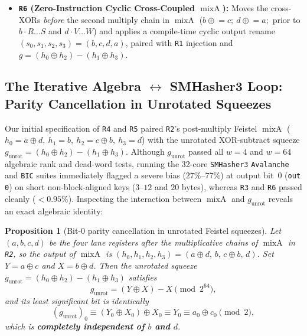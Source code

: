 \documentclass[10pt]{article}
\newtheorem{proposition}{Proposition}
\theoremstyle{definition}
\newcommand{\ROTR}{\operatorname{ROTR}}
\newcommand{\mixA}{\operatorname{mixA}}
\newcommand{\code}[1]{\texttt{#1}}
\begin{document}
\begin{itemize}
\begin{align*}
    h_1 &= (\ROTR(\mathrm{seed} + \mathrm{olen}, 29) \cdot R) \oplus (\mathrm{dom} + 2), \\
    h_2 &= \ROTR(\mathrm{seed} \oplus (\mathrm{olen} \cdot T), 41) \cdot U + 3, &
    h_3 &= (\ROTR(\mathrm{seed} + \mathrm{dom}, 53) \cdot V) \oplus W.
  \end{align*}
  Rotating \code{seed} \emph{before} multiplying by $\{Q,R,U,V\}$ moves bit 63 into interior bit positions $\{46, 34, 22, 10\}$ prior to multiplication, increasing the $\Delta\text{seed}=2^{63}$ IV Hamming weight from $4.0$ bits to $76.7$ bits and reducing $w=8$ related-seed collision transfer from $9.5\%$ to $0.5\%$ (random chance), while eliminating cross-width output prefixing ($0/200$).
  \item \textbf{\code{R6} (Zero-Instruction Cyclic Cross-Coupled $\mixA$):} Moves the cross-XORs \emph{before} the second multiply chain in $\mixA$ ($b \mathrel{\oplus}= c;\ d \mathrel{\oplus}= a;$ prior to $b \cdot R \dots S$ and $d \cdot V \dots W$) and applies a compile-time cyclic output rename $(s_0, s_1, s_2, s_3) = (b, c, d, a)$, paired with \code{R1} injection and $g = (h_0 \oplus h_2) - (h_1 \oplus h_3)$.
\end{itemize}

\subsection{The Iterative Algebra $\leftrightarrow$ SMHasher3 Loop: Parity Cancellation in Unrotated Squeezes}
\label{sec:squeezecancel}

Our initial specification of \code{R4} and \code{R5} paired \code{R2}'s post-multiply Feistel $\mixA$ ($h_0 = a \oplus d,\ h_1 = b,\ h_2 = c \oplus b,\ h_3 = d$) with the unrotated XOR-subtract squeeze $g_{\text{unrot}} = (h_0 \oplus h_2) - (h_1 \oplus h_3)$. Although $g_{\text{unrot}}$ passed all $w=4$ and $w=64$ algebraic rank and dead-word tests, running the 32-core \code{SMHasher3} \code{Avalanche} and \code{BIC} suites immediately flagged a severe bias ($27\%$--$77\%$) at output bit~0 (\code{out 0}) on short non-block-aligned keys ($3$--$12$ and $20$ bytes), whereas \code{R3} and \code{R6} passed cleanly ($<0.95\%$). Inspecting the interaction between $\mixA$ and $g_{\text{unrot}}$ reveals an exact algebraic identity:

\begin{proposition}[Bit-0 parity cancellation in unrotated Feistel squeezes]
\label{prop:squeezecancel}
Let $(a, b, c, d)$ be the four lane registers after the multiplicative chains of $\mixA$ in \code{R2}, so the output of $\mixA$ is $(h_0, h_1, h_2, h_3) = (a \oplus d,\, b,\, c \oplus b,\, d)$. Set $Y = a \oplus c$ and $X = b \oplus d$. Then the unrotated squeeze $g_{\text{unrot}} = (h_0 \oplus h_2) - (h_1 \oplus h_3)$ satisfies
\[
  g_{\text{unrot}} = (Y \oplus X) - X \pmod{2^{64}},
\]
and its least significant bit is identically
\[
  (g_{\text{unrot}})_0 \equiv (Y_0 \oplus X_0) \oplus X_0 \equiv Y_0 \equiv a_0 \oplus c_0 \pmod 2,
\]
which is \textbf{completely independent of $b$ and $d$}.
\end{proposition}
\end{document}
